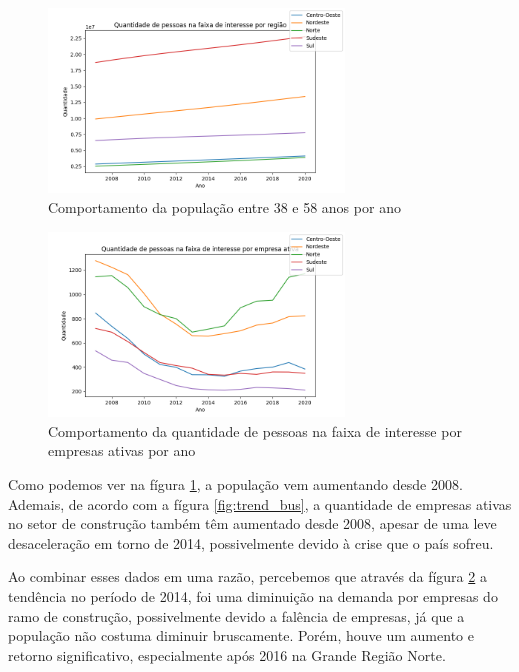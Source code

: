 \documentclass[12pt]{article}
\begin{document}
\begin{figure}[!htbp]
    \begin{center}
    \includegraphics[width=0.7\textwidth]{../figures/time_series_population.png}
    \caption{\label{fig:trend_pop} Comportamento da população entre 38 e 58 anos por ano}
    \end{center}
\end{figure}

\begin{figure}[!htbp]
    \begin{center}
    \includegraphics[width=0.7\textwidth]{../figures/time_series_ratio.png}
    \caption{\label{fig:trend_rat} Comportamento da quantidade de pessoas na faixa de interesse por empresas ativas por ano}
    \end{center}
\end{figure}

Como podemos ver na fígura \ref{fig:trend_pop}, a população vem aumentando
desde 2008. Ademais, de acordo com a fígura \ref{fig:trend_bus}, a quantidade
de empresas ativas no setor de construção também têm aumentado desde 2008,
apesar de uma leve desaceleração em torno de 2014, possivelmente devido à crise
que o país sofreu.

Ao combinar esses dados em uma razão, percebemos que através da fígura
\ref{fig:trend_rat} a tendência no período de 2014, foi uma diminuição na
demanda por empresas do ramo de construção, possivelmente devido a falência de
empresas, já que a população não costuma diminuir bruscamente. Porém, houve um aumento
e retorno significativo, especialmente após 2016 na Grande Região Norte.
\end{document}
